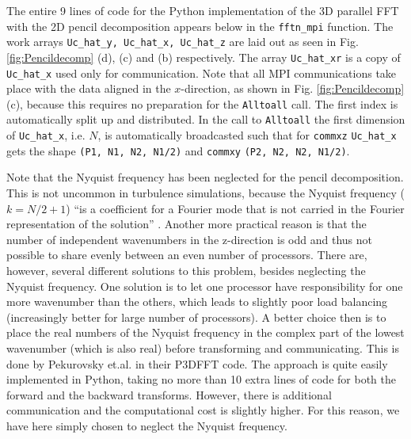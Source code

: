 \documentclass[11pt, oneside]{article}
\newcommand{\inpyth}{\lstinline[style=pythonstyle, basicstyle=\ttfamily]} %[]%
\begin{document}
The entire 9 lines of code for the Python implementation of the 3D parallel FFT with the 2D pencil 
decomposition appears below in the \inpyth{fftn_mpi} function. The work arrays \inpyth{Uc_hat_y, Uc_hat_x, Uc_hat_z} are laid out as seen in Fig. \ref{fig:Pencildecomp} (d), (c) and (b) respectively. The array 
\inpyth{Uc_hat_xr} is a copy of \inpyth{Uc_hat_x} used only for communication. Note that all MPI 
communications take place with the data aligned in the $x$-direction, as shown in Fig. 
\ref{fig:Pencildecomp} (c), because this requires no preparation for the \inpyth{Alltoall} call. The first 
index is automatically split up and distributed.  In the call to \inpyth{Alltoall} the first dimension of 
\inpyth{Uc_hat_x}, i.e. $N$, is automatically broadcasted such that for \inpyth{commxz} \inpyth{Uc_hat_x} 
gets the shape \inpyth{(P1, N1, N2, N1/2)} and \inpyth{commxy} \inpyth{(P2, N2, N2, N1/2)}.

Note that the Nyquist frequency has been neglected for the pencil decomposition. This is not uncommon in 
turbulence simulations, because the Nyquist frequency ($k=N/2+1$) ``is a coefficient for a Fourier mode 
that is not carried in the Fourier representation of the solution'' \cite{Lee2013}.  Another more practical 
reason is that the number of independent wavenumbers in the z-direction is odd and thus not possible to share evenly 
between an even number of processors. There are, however, several different solutions to this problem, 
besides neglecting the Nyquist frequency. One solution is to let one processor have responsibility for one 
more wavenumber than the others, which leads to slightly poor load balancing (increasingly better for large 
number of processors). A better choice then is to place the real numbers of the Nyquist frequency in the 
complex part of the lowest wavenumber (which is also real) before transforming and communicating. This is 
done by Pekurovsky et.al. \cite{pekurovsky2012} in their P3DFFT code. The approach is quite easily 
implemented in Python, taking no more than 10 extra lines of code for both the forward and the backward 
transforms. However, there is additional communication and the computational cost is slightly higher. For 
this reason, we have here simply chosen to neglect the Nyquist frequency.
\end{document}
